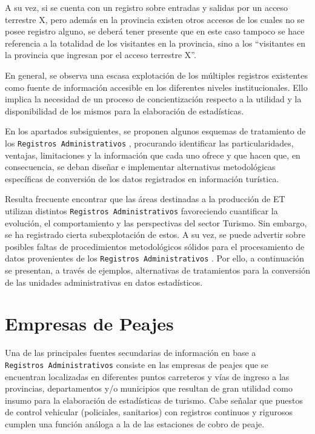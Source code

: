 \documentclass[
]{book}
\begin{document}
A su vez, si se cuenta con un registro sobre entradas y salidas por un acceso terrestre X, pero además en la provincia existen otros accesos de los cuales no se posee registro alguno, se deberá tener presente que en este caso tampoco se hace referencia a la totalidad de los visitantes en la provincia, sino a los ``visitantes en la provincia que ingresan por el acceso terrestre X''.

En general, se observa una escasa explotación de los múltiples registros existentes como fuente de información accesible en los diferentes niveles institucionales. Ello implica la necesidad de un proceso de concientización respecto a la utilidad y la disponibilidad de los mismos para la elaboración de estadísticas.

En los apartados subsiguientes, se proponen algunos esquemas de tratamiento de los \texttt{Registros\ Administrativos} , procurando identificar las particularidades, ventajas, limitaciones y la información que cada uno ofrece y que hacen que, en consecuencia, se deban diseñar e implementar alternativas metodológicas específicas de conversión de los datos registrados en información turística.

Resulta frecuente encontrar que las áreas destinadas a la producción de ET utilizan distintos \texttt{Registros\ Administrativos} favoreciendo cuantificar la evolución, el comportamiento y las perspectivas del sector Turismo. Sin embargo, se ha registrado cierta subexplotación de estos. A su vez, se puede advertir sobre posibles faltas de procedimientos metodológicos sólidos para el procesamiento de datos provenientes de los \texttt{Registros\ Administrativos} . Por ello, a continuación se presentan, a través de ejemplos, alternativas de tratamientos para la conversión de las unidades administrativas en datos estadísticos.

\hypertarget{empresas-de-peajes}{%
\section{Empresas de Peajes}\label{empresas-de-peajes}}

Una de las principales fuentes secundarias de información en base a \texttt{Registros\ Administrativos} consiste en las empresas de peajes que se encuentran localizadas en diferentes puntos carreteros y vías de ingreso a las provincias, departamentos y/o municipios que resultan de gran utilidad como insumo para la elaboración de estadísticas de turismo. Cabe señalar que puestos de control vehicular (policiales, sanitarios) con registros continuos y rigurosos cumplen una función análoga a la de las estaciones de cobro de peaje.
\end{document}
